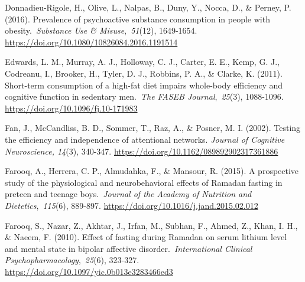 \documentclass[authordate, empirical,issue]{jote-new-article}
\begin{document}
Donnadieu-Rigole, H., Olive, L., Nalpas, B., Duny, Y., Nocca, D., \& Perney, P. (2016). Prevalence of psychoactive substance consumption in people with obesity. \emph{Substance Use \& Misuse}, \emph{51}(12), 1649-1654. \url{https://doi.org/10.1080/10826084.2016.1191514}



Edwards, L. M., Murray, A. J., Holloway, C. J., Carter, E. E., Kemp, G. J., Codreanu, I., Brooker, H., Tyler, D. J., Robbins, P. A., \& Clarke, K. (2011). Short-term consumption of a high-fat diet impairs whole-body efficiency and cognitive function in sedentary men. \emph{The FASEB Journal}, \emph{25}(3), 1088-1096. \url{https://doi.org/10.1096/fj.10-171983}






Fan, J., McCandliss, B. D., Sommer, T., Raz, A., \& Posner, M. I. (2002). Testing the efficiency and independence of attentional networks. \emph{Journal of Cognitive Neuroscience, 14}(3), 340-347. \url{https://doi.org/10.1162/089892902317361886}






Farooq, A., Herrera, C. P., Almudahka, F., \& Mansour, R. (2015). A prospective study of the physiological and neurobehavioral effects of Ramadan fasting in preteen and teenage boys. \emph{Journal of the Academy of Nutrition and Dietetics}, \emph{115}(6), 889-897. \url{https://doi.org/10.1016/j.jand.2015.02.012}



Farooq, S., Nazar, Z., Akhtar, J., Irfan, M., Subhan, F., Ahmed, Z., Khan, I. H., \& Naeem, F. (2010). Effect of fasting during Ramadan on serum lithium level and mental state in bipolar affective disorder. \emph{International Clinical Psychopharmacology}, \emph{25}(6), 323-327. \url{https://doi.org/10.1097/yic.0b013e3283466ed3}
\end{document}

